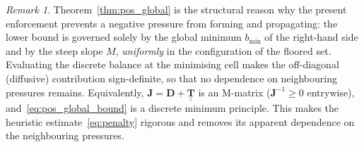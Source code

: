 \documentclass[a4paper,fleqn]{cas-sc}
\theoremstyle{definition}
\theoremstyle{remark}
\newtheorem{remark}{Remark}
\begin{document}
\begin{remark}
Theorem~\ref{thm:pos_global} is the structural reason why the present enforcement
prevents a negative pressure from forming and propagating: the lower bound is governed
solely by the global minimum $b_{\min}$ of the right-hand side and by the steep slope
$M$, \emph{uniformly} in the configuration of the floored set. Evaluating the discrete
balance at the minimising cell makes the off-diagonal (diffusive) contribution
sign-definite, so that no dependence on neighbouring pressures remains. Equivalently,
$\mathbf{J}=\mathbf{D}+\underline{\underline{\mathbf{T}}}$ is an M-matrix
($\mathbf{J}^{-1}\ge 0$ entrywise), and~\eqref{eq:pos_global_bound} is a discrete minimum
principle. This makes the heuristic estimate~\eqref{eq:penalty} rigorous and removes its
apparent dependence on the neighbouring pressures.
\end{remark}
\end{document}

